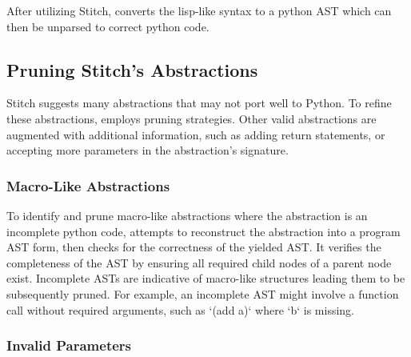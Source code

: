 
After utilizing Stitch, \toolname converts the lisp-like syntax to a python AST which can then be unparsed to correct python code. 


\subsection{Pruning Stitch's Abstractions}
Stitch suggests many abstractions that may not port well to Python. To refine these abstractions, \toolname employs pruning strategies. Other valid abstractions are augmented with additional information, such as adding return statements, or accepting more parameters in the abstraction's signature. 

\subsubsection{Macro-Like Abstractions}
To identify and prune macro-like abstractions where the abstraction is an incomplete python code, \toolname attempts to reconstruct the abstraction into a program AST form, then checks for the correctness of the yielded AST. It verifies the completeness of the AST by ensuring all required child nodes of a parent node exist. Incomplete ASTs are indicative of macro-like structures leading them to be subsequently pruned. For example, an incomplete AST might involve a function call without required arguments, such as `(add a)` where `b` is missing. 

\subsubsection{Invalid Parameters}

